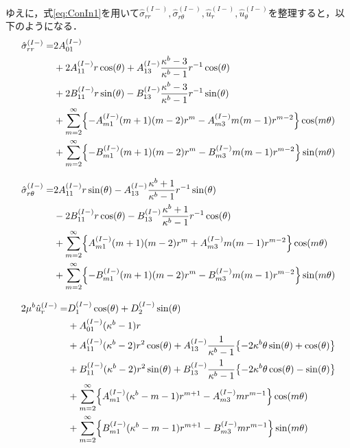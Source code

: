 ゆえに，式\eqref{eq:ConIn1}を用いて$\hat{\sigma}_{rr}^{(I-)},\hat{\sigma}_{r\theta}^{(I-)},\hat{u}_{r}^{(I-)},\hat{u}_{\theta}^{(I-)}$を整理すると，以下のようになる．
\begin{align}
	\hat{\sigma}_{rr}^{(I-)} =&2A_{01}^{(I-)}
	\nonumber
	\\
	&+2A_{11}^{(I-)}r\cos(\theta)
	+A_{13}^{(I-)}\frac{\kappa^{b}-3}{\kappa^{b}-1}r^{-1}\cos(\theta)
	\nonumber
	\\
	&+2B_{11}^{(I-)}r\sin(\theta)
	-B_{13}^{(I-)}\frac{\kappa^{b}-3}{\kappa^{b}-1}r^{-1}\sin(\theta)
	\nonumber
	\\
	&+\sum_{m=2}^{\infty}\Bigl\{-A_{m1}^{(I-)}(m+1)(m-2)r^{m}
	-A_{m3}^{(I-)}m(m-1)r^{m-2}\Bigr\}\cos(m\theta)
	\nonumber
	\\
	&+\sum_{m=2}^{\infty}\Bigl\{-B_{m1}^{(I-)}(m+1)(m-2)r^{m}
	-B_{m3}^{(I-)}m(m-1)r^{m-2}\Bigr\}\sin(m\theta)
	\label{eq:SigmaRRIn1}
\end{align}

\begin{align}
	\hat{\sigma}_{r\theta}^{(I-)} =
	&2A_{11}^{(I-)}r\sin(\theta)
	-A_{13}^{(I-)}\frac{\kappa^{b}+1}{\kappa^{b}-1}r^{-1}\sin(\theta)
	\nonumber
	\\
	&-2B_{11}^{(I-)}r\cos(\theta)
	-B_{13}^{(I-)}\frac{\kappa^{b}+1}{\kappa^{b}-1}r^{-1}\cos(\theta)
	\nonumber
	\\
	&+\sum_{m=2}^{\infty}\Bigl\{A_{m1}^{(I-)}(m+1)(m-2)r^{m}
	+A_{m3}^{(I-)}m(m-1)r^{m-2}\Bigr\}\cos(m\theta)
	\nonumber
	\\
	&+\sum_{m=2}^{\infty}\Bigl\{-B_{m1}^{(I-)}(m+1)(m-2)r^{m}
	-B_{m3}^{(I-)}m(m-1)r^{m-2}\Bigr\}\sin(m\theta)
	\label{eq:SigmaRThIn1}
\end{align}

\begin{align}
2\mu^{b}\hat{u}_{r}^{(I-)} =&D_{1}^{(I-)}\cos(\theta)+D_{2}^{(I-)}\sin(\theta)
\nonumber
\\
&+A_{01}^{(I-)}(\kappa^{b}-1)r
\nonumber
\\
&+A_{11}^{(I-)}(\kappa^{b}-2)r^2\cos(\theta)
+A_{13}^{(I-)}\frac{1}{\kappa^{b}-1}\bigl\{ -2\kappa^{b}\theta\sin(\theta) +\cos(\theta) \bigr\}
\nonumber
\\
&+B_{11}^{(I-)}(\kappa^{b}-2)r^2\sin(\theta)
+B_{13}^{(I-)}\frac{1}{\kappa^{b}-1}\bigl\{ -2\kappa^{b}\theta\cos(\theta) -\sin(\theta) \bigr\}
\nonumber
\\
&+\sum_{m=2}^{\infty}\Bigl\{A_{m1}^{(I-)}(\kappa^{b}-m-1)r^{m+1}
-A_{m3}^{(I-)}mr^{m-1}\Bigr\}\cos(m\theta)
\nonumber
\\
&+\sum_{m=2}^{\infty}\Bigl\{B_{m1}^{(I-)}(\kappa^{b}-m-1)r^{m+1}
-B_{m3}^{(I-)}mr^{m-1}\Bigr\}\sin(m\theta)
\label{eq:URIn1}
\end{align}

